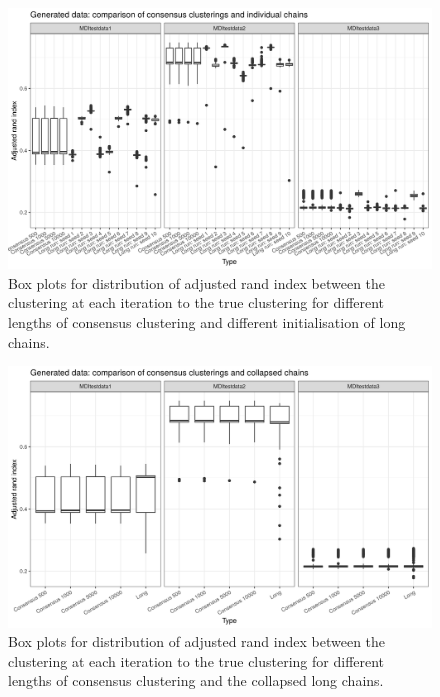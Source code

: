 \documentclass[12pt]{article} %
\begin{document}
		\newpage
	
		\begin{figure}
		\centering
		\includegraphics[scale=0.9]{Images/Gen_data/Case_2/box_plot_ari_true_clustering.png}
		\caption{Box plots for distribution of adjusted rand index between the clustering at each iteration to the true clustering for different lengths of consensus clustering and different initialisation of long chains.}
		\label{fig:gen_data_case_2_boxplot}
	\end{figure}

	\newpage

	\begin{figure}[!htb]
		\centering
		\includegraphics[scale=0.65]{Images/Gen_data/Case_2/box_plot_ari_true_clustering_collapsed_long.png}
		\caption{Box plots for distribution of adjusted rand index between the clustering at each iteration to the true clustering for different lengths of consensus clustering and the collapsed long chains.}
		\label{fig:gen_data_case_2_collapsed_boxplot}
	\end{figure}
	
\end{document}
